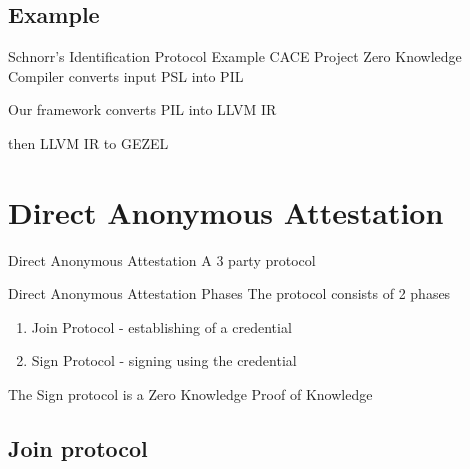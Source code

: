 \documentclass{beamer}
\begin{document}
\subsection{Example}

\begin{frame}{Schnorr's Identification Protocol Example}
  CACE Project Zero Knowledge Compiler converts input PSL into PIL

  \vfill

  \pause

  Our framework converts PIL into LLVM IR

  \vfill

  \pause

  then LLVM IR to GEZEL
\end{frame}

\section{Direct Anonymous Attestation}

\begin{frame}{Direct Anonymous Attestation}
  A 3 party protocol

  \vrule

  \hfil {}
\end{frame}

\begin{frame}{Direct Anonymous Attestation Phases}
  The protocol consists of 2 phases
  \begin{enumerate}
  \pause \item Join Protocol - establishing of a credential
  \pause \item Sign Protocol - signing using the credential
  \end{enumerate}

  \pause

  The Sign protocol is a Zero Knowledge Proof of Knowledge
\end{frame}

\subsection{Join protocol}
\end{document}

